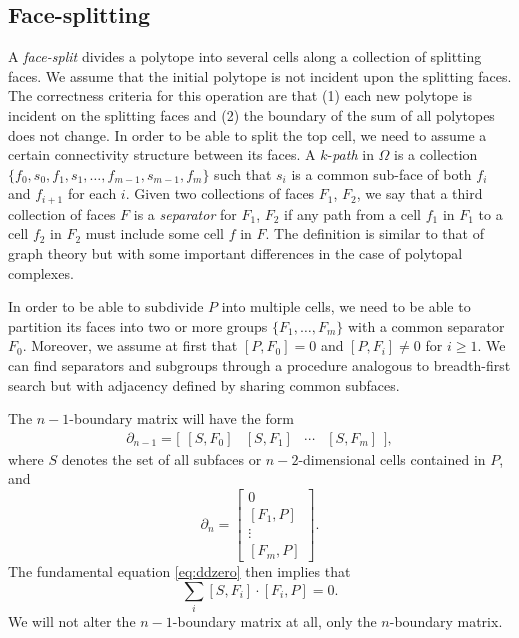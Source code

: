 \documentclass[twocolumn]{article}
\begin{document}
\subsection{Face-splitting}

A \emph{face-split} divides a polytope into several cells along a collection of splitting faces.
We assume that the initial polytope is not incident upon the splitting faces.
The correctness criteria for this operation are that (1) each new polytope is incident on the splitting faces and (2) the boundary of the sum of all polytopes does not change.
In order to be able to split the top cell, we need to assume a certain connectivity structure between its faces.
A $k$-\emph{path} in $\Omega$ is a collection $\{f_0, s_0, f_1, s_1, \ldots, f_{m - 1}, s_{m - 1}, f_m\}$ such that $s_i$ is a common sub-face of both $f_i$ and $f_{i + 1}$ for each $i$.
Given two collections of faces $F_1$, $F_2$, we say that a third collection of faces $F$ is a \emph{separator} for $F_1$, $F_2$ if any path from a cell $f_1$ in $F_1$ to a cell $f_2$ in $F_2$ must include some cell $f$ in $F$.
The definition is similar to that of graph theory but with some important differences in the case of polytopal complexes.

In order to be able to subdivide $P$ into multiple cells, we need to be able to partition its faces into two or more groups $\{F_1, \ldots, F_m\}$ with a common separator $F_0$.
Moreover, we assume at first that $[P, F_0] = 0$ and $[P, F_i] \neq 0$ for $i \ge 1$.
We can find separators and subgroups through a procedure analogous to breadth-first search but with adjacency defined by sharing common subfaces.

The $n - 1$-boundary matrix will have the form
\begin{equation}
    \partial_{n - 1} = \Big[\begin{matrix}[S, F_0] & [S, F_1] & \cdots & [S, F_m]\end{matrix}\Big],
\end{equation}
where $S$ denotes the set of all subfaces or $n - 2$-dimensional cells contained in $P$, and
\begin{equation}
    \partial_n = \left[\begin{matrix} 0 \\ [F_1, P] \\ \vdots \\ [F_m, P]\end{matrix}\right].
\end{equation}
The fundamental equation \eqref{eq:ddzero} then implies that
\begin{equation}
    \sum_i[S, F_i]\cdot[F_i, P] = 0.
    \label{eq:face-split-ddzero}
\end{equation}
We will not alter the $n - 1$-boundary matrix at all, only the $n$-boundary matrix.
\end{document}
